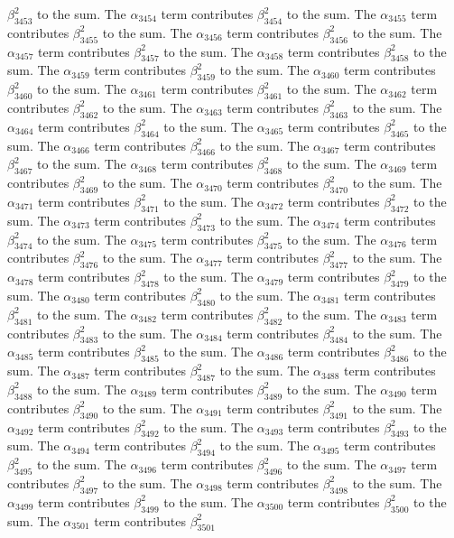 \begin{lemma}
$\beta_{3453}^{2}$ to the sum. The $\alpha_{3454}$ term contributes $\beta_{3454}^{2}$ to the sum. The $\alpha_{3455}$ term contributes $\beta_{3455}^{2}$ to the sum. The $\alpha_{3456}$ term contributes $\beta_{3456}^{2}$ to the sum. The $\alpha_{3457}$ term contributes $\beta_{3457}^{2}$ to the sum. The $\alpha_{3458}$ term contributes $\beta_{3458}^{2}$ to the sum. The $\alpha_{3459}$ term contributes $\beta_{3459}^{2}$ to the sum. The $\alpha_{3460}$ term contributes $\beta_{3460}^{2}$ to the sum. The $\alpha_{3461}$ term contributes $\beta_{3461}^{2}$ to the sum. The $\alpha_{3462}$ term contributes $\beta_{3462}^{2}$ to the sum. The $\alpha_{3463}$ term contributes $\beta_{3463}^{2}$ to the sum. The $\alpha_{3464}$ term contributes $\beta_{3464}^{2}$ to the sum. The $\alpha_{3465}$ term contributes $\beta_{3465}^{2}$ to the sum. The $\alpha_{3466}$ term contributes $\beta_{3466}^{2}$ to the sum. The $\alpha_{3467}$ term contributes $\beta_{3467}^{2}$ to the sum. The $\alpha_{3468}$ term contributes $\beta_{3468}^{2}$ to the sum. The $\alpha_{3469}$ term contributes $\beta_{3469}^{2}$ to the sum. The $\alpha_{3470}$ term contributes $\beta_{3470}^{2}$ to the sum. The $\alpha_{3471}$ term contributes $\beta_{3471}^{2}$ to the sum. The $\alpha_{3472}$ term contributes $\beta_{3472}^{2}$ to the sum. The $\alpha_{3473}$ term contributes $\beta_{3473}^{2}$ to the sum. The $\alpha_{3474}$ term contributes $\beta_{3474}^{2}$ to the sum. The $\alpha_{3475}$ term contributes $\beta_{3475}^{2}$ to the sum. The $\alpha_{3476}$ term contributes $\beta_{3476}^{2}$ to the sum. The $\alpha_{3477}$ term contributes $\beta_{3477}^{2}$ to the sum. The $\alpha_{3478}$ term contributes $\beta_{3478}^{2}$ to the sum. The $\alpha_{3479}$ term contributes $\beta_{3479}^{2}$ to the sum. The $\alpha_{3480}$ term contributes $\beta_{3480}^{2}$ to the sum. The $\alpha_{3481}$ term contributes $\beta_{3481}^{2}$ to the sum. The $\alpha_{3482}$ term contributes $\beta_{3482}^{2}$ to the sum. The $\alpha_{3483}$ term contributes $\beta_{3483}^{2}$ to the sum. The $\alpha_{3484}$ term contributes $\beta_{3484}^{2}$ to the sum. The $\alpha_{3485}$ term contributes $\beta_{3485}^{2}$ to the sum. The $\alpha_{3486}$ term contributes $\beta_{3486}^{2}$ to the sum. The $\alpha_{3487}$ term contributes $\beta_{3487}^{2}$ to the sum. The $\alpha_{3488}$ term contributes $\beta_{3488}^{2}$ to the sum. The $\alpha_{3489}$ term contributes $\beta_{3489}^{2}$ to the sum. The $\alpha_{3490}$ term contributes $\beta_{3490}^{2}$ to the sum. The $\alpha_{3491}$ term contributes $\beta_{3491}^{2}$ to the sum. The $\alpha_{3492}$ term contributes $\beta_{3492}^{2}$ to the sum. The $\alpha_{3493}$ term contributes $\beta_{3493}^{2}$ to the sum. The $\alpha_{3494}$ term contributes $\beta_{3494}^{2}$ to the sum. The $\alpha_{3495}$ term contributes $\beta_{3495}^{2}$ to the sum. The $\alpha_{3496}$ term contributes $\beta_{3496}^{2}$ to the sum. The $\alpha_{3497}$ term contributes $\beta_{3497}^{2}$ to the sum. The $\alpha_{3498}$ term contributes $\beta_{3498}^{2}$ to the sum. The $\alpha_{3499}$ term contributes $\beta_{3499}^{2}$ to the sum. The $\alpha_{3500}$ term contributes $\beta_{3500}^{2}$ to the sum. The $\alpha_{3501}$ term contributes $\beta_{3501}^{2}$ 
\end{lemma}
